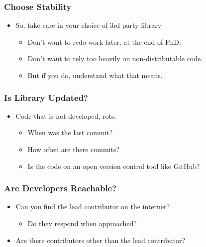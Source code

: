\subsubsection{Choose Stability}\label{choose-stability}

\begin{itemize}
\itemsep1pt\parskip0pt
\item
  So, take care in your choice of 3rd party library

  \begin{itemize}
  \itemsep1pt\parskip0pt
  \item
    Don't want to redo work later, at the end of PhD.
  \item
    Don't want to rely too heavily on non-distributable code.
  \item
    But if you do, understand what that means.
  \end{itemize}
\end{itemize}

\subsubsection{Is Library Updated?}\label{is-library-updated}

\begin{itemize}
\itemsep1pt\parskip0pt
\item
  Code that is not developed, rots.

  \begin{itemize}
  \itemsep1pt\parskip0pt
  \item
    When was the last commit?
  \item
    How often are there commits?
  \item
    Is the code on an open version control tool like GitHub?
  \end{itemize}
\end{itemize}

\subsubsection{Are Developers
Reachable?}\label{are-developers-reachable}

\begin{itemize}
\itemsep1pt\parskip0pt
\item
  Can you find the lead contributor on the internet?

  \begin{itemize}
  \itemsep1pt\parskip0pt
  \item
    Do they respond when approached?
  \end{itemize}
\item
  Are there contributors other than the lead contributor?
\end{itemize}

